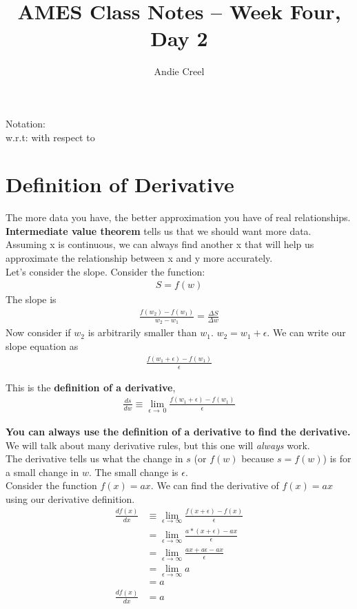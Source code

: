 \documentclass{article}
\title{AMES Class Notes -- Week Four, Day 2}
\author{Andie Creel}
\begin{document}
\maketitle
Notation: \\
w.r.t: with respect to


\section{Definition of Derivative}
The more data you have, the better approximation you have of real relationships.\\

\textbf{Intermediate value theorem} tells us that we should want more data. Assuming x is continuous, we can always find another x that will help us approximate the relationship between x and y more accurately. \\

Let's consider the slope. Consider the function: 
\begin{align}
    S = f(w) 
\end{align}
The slope is 
\begin{align*}
    \frac{f(w_2) - f(w_1)}{w_2-w_1} = \frac{\Delta S}{ \Delta w}
\end{align*}
Now consider if $w_2$ is arbitrarily smaller than $w_1$. $w_2 = w_1 + \epsilon$. We can write our slope equation as 
\begin{align*}
    \frac{f(w_1 + \epsilon) - f(w_1)}{\epsilon}
\end{align*}

This is the \textbf{definition of a derivative}, 
\begin{align*}
    \frac{ds}{dw} \equiv \lim_{\epsilon \to \ 0} \frac{f(w_1 + \epsilon) - f(w_1)}{\epsilon}
\end{align*}

\textbf{You can always use the definition of a derivative to find the derivative.} We will talk about many derivative rules, but this one will \textit{always} work.\\

The derivative tells us what the change in $s$ (or $f(w)$ because $s = f(w)$) is for a small change in $w$. The small change is $\epsilon$. \\

Consider the function $f(x) = ax$. We can find the derivative of $f(x) = ax$ using our derivative definition. \\

\begin{align}
    \frac{df(x)}{dx} &\equiv \lim_{\epsilon \to \infty} \frac{f(x+ \epsilon) - f(x)}{\epsilon}\\
    &= \lim_{\epsilon \to \infty} \frac{a*(x + \epsilon) - ax}{\epsilon}\\
    &= \lim_{\epsilon \to \infty} \frac{ax + a\epsilon - ax}{\epsilon}\\
    &= \lim_{\epsilon \to \infty} a\\
    &= a \\
    \frac{df(x)}{dx} &= a
\end{align}
\end{document}
